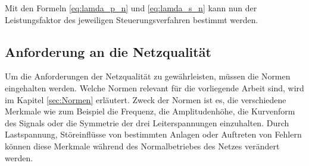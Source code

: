 Mit den Formeln \ref{eq:lamda_p_n} und \ref{eq:lamda_s_n} kann nun der Leistungsfaktor des jeweiligen Steuerungsverfahren bestimmt werden.   



\subsection{Anforderung an die Netzqualität}

Um die Anforderungen der Netzqualität zu gewährleisten, müssen die Normen eingehalten werden. Welche Normen relevant für die vorliegende Arbeit sind, wird im Kapitel \ref{sec:Normen} erläutert. Zweck der Normen ist es, die verschiedene Merkmale wie zum Beispiel die Frequenz, die Amplitudenhöhe, die Kurvenform des Signals oder die Symmetrie der drei Leiterspannungen einzuhalten. Durch Lastspannung, Störeinflüsse von bestimmten Anlagen oder Auftreten von Fehlern können diese Merkmale während des Normalbetriebes des Netzes verändert werden. 

